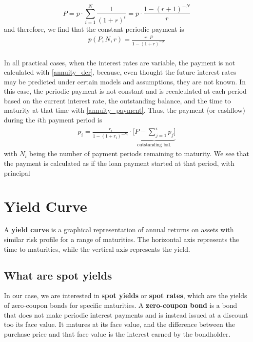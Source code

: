 \documentclass[11pt]{article}
\begin{document}
$$P=p\cdot \sum_{i=1}^N\frac{1}{(1+r)^i}=p\cdot\frac{1-(r+1)^{-N}}{r}$$
and therefore, we find that the constant periodic payment is
\begin{align}
	p(P, N, r)=\frac{r\cdot P}{1-(1+r)^{-N}}\label{annuity_payment}
\end{align}
\\

In all practical cases, when the interest rates are variable, the payment is not calculated with \eqref{annuity_der}, because, even thought the future interest rates may be predicted under certain models and assumptions, they are not known. In this case, the periodic payment is not constant and is recalculated at each period based on the current interest rate, the outstanding balance, and the time to maturity at that time with \eqref{annuity_payment}. Thus, the payment (or cashflow) during the $i$th payment period is
\begin{align}
	p_i=\frac{r_i}{1-(1+r_i)^{-N_i}}\cdot \underbrace{\bigg [P-\sum_{j=1}^ip_j\bigg]}_{\text{outstanding bal.}}
\end{align}
with $N_i$ being the number of payment periods remaining to maturity. We see that the payment is calculated as if the loan payment started at that period, with principal




\section{Yield Curve}

A \textbf{yield curve} is a graphical representation of annual returns on assets with similar risk profile for a range of maturities. The horizontal axis represents the time to maturities, while the vertical axis represents the yield.

\subsection{What are spot yields}

 In our case, we are interested in \textbf{spot yields} or \textbf{spot rates}, which are the yields of zero-coupon bonds for specific maturities. A \textbf{zero-coupon bond} is a bond that does not make periodic interest payments and is instead issued at a discount too its face value. It matures at its face value, and the difference between the purchase price and that face value is the interest earned by the bondholder.\\
 
\end{document}
